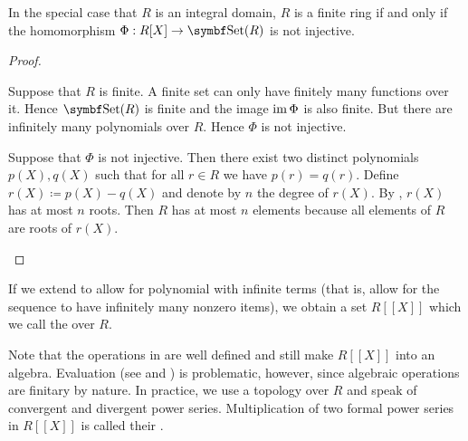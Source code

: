 \begin{proposition}\label{thm:polynomial_embedding_behavior}
  In the special case that \( R \) is an integral domain, \( R \) is a finite ring if and only if the homomorphism \( \Phi: R[X] \to \Cat{Set}(R) \) is not injective.
\end{proposition}
\begin{proof}\mbox{}
  \begin{description}
    \Implies Suppose that \( R \) is finite. A finite set can only have finitely many functions over it. Hence \( \Cat{Set}(R) \) is finite and the image \( \operatorname{im} \Phi \) is also finite. But there are infinitely many polynomials over \( R \). Hence \( \Phi \) is not injective.

    \ImpliedBy Suppose that \( \Phi \) is not injective. Then there exist two distinct polynomials \( p(X), q(X) \) such that for all \( r \in R \) we have \( p(r) = q(r) \). Define \( r(X) \coloneqq p(X) - q(X) \) and denote by \( n \) the degree of \( r(X) \). By , \( r(X) \) has at most \( n \) roots. Then \( R \) has at most \( n \) elements because all elements of \( R \) are roots of \( r(X) \).
  \end{description}
\end{proof}

\begin{definition}\label{def:formal_power_series}
  If we extend  to allow for polynomial with infinite terms (that is, allow for the sequence to have infinitely many nonzero items), we obtain a set \( R[[X]] \) which we call the  over \( R \).

  Note that the operations in  are well defined and still make \( R[[X]] \) into an algebra. Evaluation (see  and ) is problematic, however, since algebraic operations are finitary by nature. In practice, we use a topology over \( R \) and speak of convergent and divergent power series. Multiplication of two formal power series in \( R[[X]] \) is called their .
\end{definition}

